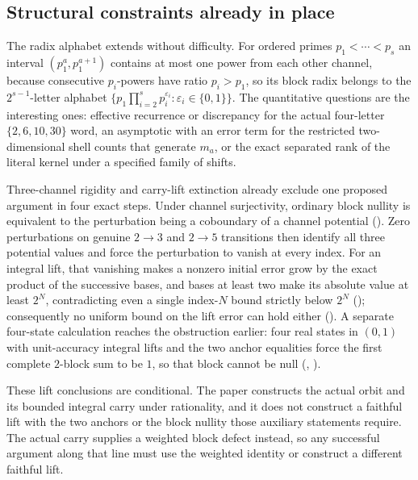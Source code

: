 \documentclass[11pt]{article}
\begin{document}
\subsection{Structural constraints already in place}

The radix alphabet extends without difficulty.  For ordered primes
$p_1<\cdots<p_s$ an interval $(p_1^{a},p_1^{a+1})$ contains at most one power
from each other channel, because consecutive $p_i$-powers have ratio
$p_i>p_1$, so its block radix belongs to the $2^{s-1}$-letter alphabet
$\{p_1\prod_{i=2}^{s}p_i^{\varepsilon_i}:\varepsilon_i\in\{0,1\}\}$.  The
quantitative questions are the interesting ones: effective recurrence or
discrepancy for the actual four-letter $\{2,6,10,30\}$ word, an asymptotic with
an error term for the restricted two-dimensional shell counts that generate
$m_a$, or the exact separated rank of the literal kernel under a specified
family of shifts.

Three-channel rigidity and carry-lift extinction already exclude one proposed
argument in four exact steps.  Under channel surjectivity, ordinary block
nullity is equivalent to the perturbation being a coboundary of a channel
potential
().  Zero perturbations on genuine $2\to3$ and $2\to5$ transitions
then identify all three potential values and force the perturbation to vanish
at every index.  For an integral lift, that vanishing makes a nonzero initial
error grow by the exact product of the successive bases, and bases at least two
make its absolute value at least $2^{N}$, contradicting even a single
index-$N$ bound strictly below $2^{N}$
(); consequently no uniform bound on the lift error can hold either
().  A separate four-state calculation reaches the obstruction
earlier: four real states in $(0,1)$ with unit-accuracy integral lifts and the
two anchor equalities force the first complete $2$-block sum to be $1$, so that
block cannot be null
(,
).

These lift conclusions are conditional.  The paper constructs the actual orbit
and its bounded integral carry under rationality, and it does not construct a
faithful lift with the two anchors or the block nullity those auxiliary
statements require.  The actual carry supplies a weighted block defect instead,
so any successful argument along that line must use the weighted identity or
construct a different faithful lift.
\end{document}
